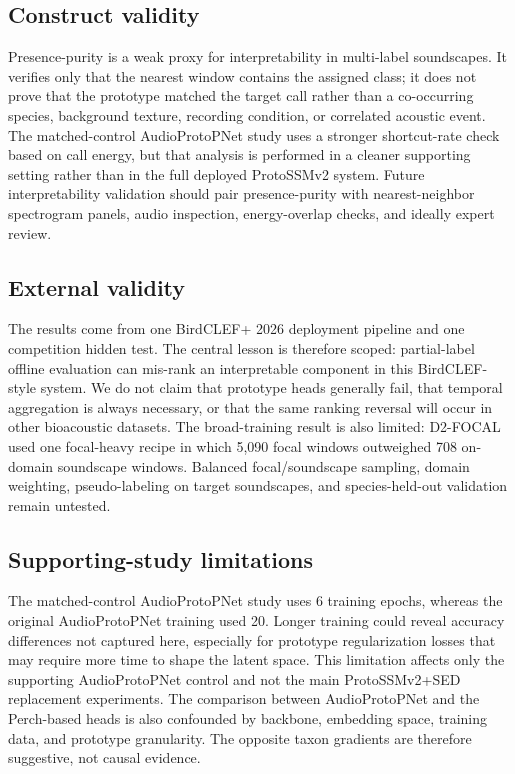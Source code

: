 \documentclass{ceurart}
\begin{document}
\subsection{Construct validity}

Presence-purity is a weak proxy for interpretability in multi-label soundscapes.
It verifies only that the nearest window contains the assigned class; it does not prove that the prototype matched the target call rather than a co-occurring species, background texture, recording condition, or correlated acoustic event.
The matched-control AudioProtoPNet study uses a stronger shortcut-rate check based on call energy, but that analysis is performed in a cleaner supporting setting rather than in the full deployed ProtoSSMv2 system.
Future interpretability validation should pair presence-purity with nearest-neighbor spectrogram panels, audio inspection, energy-overlap checks, and ideally expert review.

\subsection{External validity}

The results come from one BirdCLEF+ 2026 deployment pipeline and one competition hidden test.
The central lesson is therefore scoped: partial-label offline evaluation can mis-rank an interpretable component in this BirdCLEF-style system.
We do not claim that prototype heads generally fail, that temporal aggregation is always necessary, or that the same ranking reversal will occur in other bioacoustic datasets.
The broad-training result is also limited: D2-FOCAL used one focal-heavy recipe in which 5,090 focal windows outweighed 708 on-domain soundscape windows.
Balanced focal/soundscape sampling, domain weighting, pseudo-labeling on target soundscapes, and species-held-out validation remain untested.

\subsection{Supporting-study limitations}

The matched-control AudioProtoPNet study uses 6 training epochs, whereas the original AudioProtoPNet training used 20.
Longer training could reveal accuracy differences not captured here, especially for prototype regularization losses that may require more time to shape the latent space.
This limitation affects only the supporting AudioProtoPNet control and not the main ProtoSSMv2+SED replacement experiments.
The comparison between AudioProtoPNet and the Perch-based heads is also confounded by backbone, embedding space, training data, and prototype granularity.
The opposite taxon gradients are therefore suggestive, not causal evidence.
\end{document}
